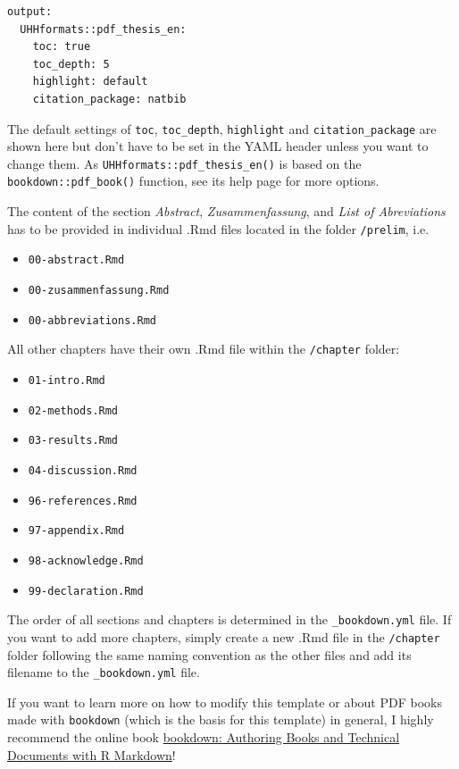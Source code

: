 \documentclass[a4paper,12pt]{article}
\providecommand{\tightlist}{%
  \setlength{\itemsep}{0pt}\setlength{\parskip}{0pt}}
\begin{document}
\begin{verbatim}
output:
  UHHformats::pdf_thesis_en:
    toc: true
    toc_depth: 5
    highlight: default
    citation_package: natbib
\end{verbatim}
The default settings of \texttt{toc}, \texttt{toc\_depth}, \texttt{highlight} and \texttt{citation\_package} are shown here but don't have to be set in the YAML header unless you want to change them. As \texttt{UHHformats::pdf\_thesis\_en()} is based on the \texttt{bookdown::pdf\_book()} function, see its help page for more options.

The content of the section \emph{Abstract}, \emph{Zusammenfassung}, and \emph{List of Abreviations} has to be provided in individual .Rmd files located in the folder \texttt{/prelim}, i.e.
\begin{itemize}
\tightlist
\item
  \texttt{00-abstract.Rmd}
\item
  \texttt{00-zusammenfassung.Rmd}
\item
  \texttt{00-abbreviations.Rmd}
\end{itemize}
All other chapters have their own .Rmd file within the \texttt{/chapter} folder:
\begin{itemize}
\tightlist
\item
  \texttt{01-intro.Rmd}
\item
  \texttt{02-methods.Rmd}
\item
  \texttt{03-results.Rmd}
\item
  \texttt{04-discussion.Rmd}
\item
  \texttt{96-references.Rmd}
\item
  \texttt{97-appendix.Rmd}
\item
  \texttt{98-acknowledge.Rmd}
\item
  \texttt{99-declaration.Rmd}
\end{itemize}
The order of all sections and chapters is determined in the \texttt{\_bookdown.yml} file. If you want to add more chapters, simply create a new .Rmd file in the \texttt{/chapter} folder following the same naming convention as the other files and add its filename to the \texttt{\_bookdown.yml} file.

If you want to learn more on how to modify this template or about PDF books made with \texttt{bookdown} (which is the basis for this template) in general, I highly recommend the online book \href{https://bookdown.org/yihui/bookdown/}{bookdown: Authoring Books and Technical Documents with R Markdown}!
\end{document}
